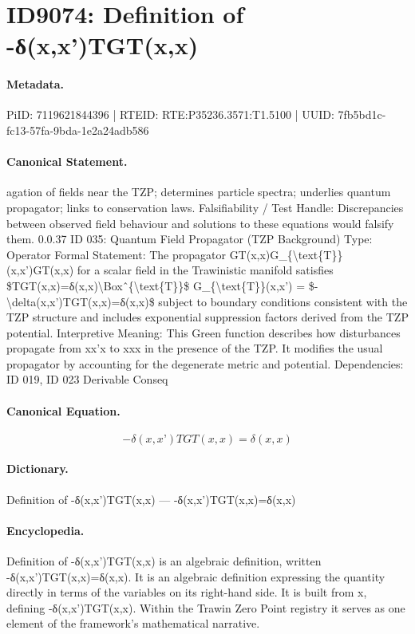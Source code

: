 \section*{ID9074: Definition of -δ(x,x’)TGT(x,x)}
\paragraph{Metadata.}
PiID: 7119621844396 | RTEID: RTE:P35236.3571:T1.5100 | UUID: 7fb5bd1c-fc13-57fa-9bda-1e2a24adb586

\paragraph{Canonical Statement.}
agation of fields near the TZP; determines particle spectra; underlies quantum propagator; links to conservation laws. Falsifiability / Test Handle: Discrepancies between observed field behaviour and solutions to these equations would falsify them. 0.0.37 ID 035: Quantum Field Propagator (TZP Background) Type: Operator Formal Statement: The propagator GT(x,x)G\_\{\textbackslash{}text\{T\}\}(x,x’)GT(x,x) for a scalar field in the Trawinistic manifold satisfies \$TGT(x,x)=δ(x,x)\textbackslash{}Boxˆ\{\textbackslash{}text\{T\}\}\$ G\_\{\textbackslash{}text\{T\}\}(x,x’) = \$-\textbackslash{}delta(x,x’)TGT(x,x)=δ(x,x)\$ subject to boundary conditions consistent with the TZP structure and includes exponential suppression factors derived from the TZP potential. Interpretive Meaning: This Green function describes how disturbances propagate from xx’x to xxx in the presence of the TZP. It modifies the usual propagator by accounting for the degenerate metric and potential. Dependencies: ID 019, ID 023 Derivable Conseq

\paragraph{Canonical Equation.}
\[
-\delta(x,x’)TGT(x,x)=δ(x,x)
\]

\paragraph{Dictionary.}
Definition of -δ(x,x’)TGT(x,x) — -δ(x,x’)TGT(x,x)=δ(x,x)

\paragraph{Encyclopedia.}
Definition of -δ(x,x’)TGT(x,x) is an algebraic definition, written -δ(x,x’)TGT(x,x)=δ(x,x). It is an algebraic definition expressing the quantity directly in terms of the variables on its right-hand side. It is built from x, defining -δ(x,x’)TGT(x,x). Within the Trawin Zero Point registry it serves as one element of the framework's mathematical narrative.
